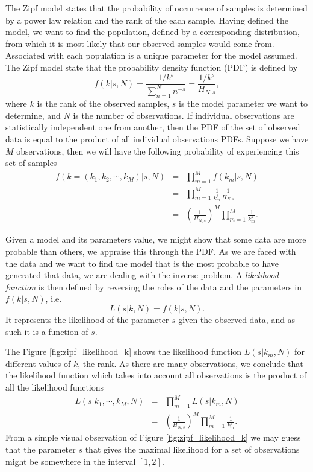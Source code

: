 The Zipf model states that the probability of occurrence of samples is determined by a power law relation
and the rank of the each sample. Having defined the model, we want to find the population, defined
by a corresponding distribution, from which it is most likely that our observed samples would come from.
Associated with each population is a unique parameter for the model assumed. The Zipf model state that the 
probability density function (PDF) is defined by
\begin{equation}
\label{eq:zipf_relation}
f(k | s, N) = \frac{1/k^s}{\sum_{n=1}^{N} n^{-s}} = \frac{1/k^s}{H_{N,s}} ,
\end{equation} 
where $k$ is the rank of the observed samples, $s$ is the model parameter we want to determine,
and $N$ is the number of observations.
If individual observations are statistically independent one from another, then the PDF
of the set of observed data is equal to the product of all individual observations PDFs.
Suppose we have $M$ observations, then we will have the following probability
of experiencing this set of samples
\begin{eqnarray}
f(k=(k_1, k_2, \cdots, k_M) | s, N) &=& \prod_{m=1}^{M} f(k_m | s, N) \nonumber \\
		&=& \prod_{m=1}^{M} \frac{1}{k_m^s} \frac{1}{H_{N,s}} \nonumber \\
		&=& \left( \frac{1}{H_{N,s}} \right)^M \prod_{m=1}^{M} \frac{1}{k_m^s} .
\end{eqnarray}

Given a model and its parameters value, we might show that some data are more probable than others,
we appraise this through the PDF. As we are faced with the data and we want to find the model
that is the most probable to have generated that data, we are dealing with the inverse problem.
A \textit{likelihood function} is then defined by reversing the roles of the data and the parameters
in $f(k | s, N)$, i.e.
\begin{equation}
L(s | k, N) = f(k | s, N) .
\end{equation}
It represents the likelihood of the parameter $s$ given the observed data, and as such it is a function of $s$.

The Figure \ref{fig:zipf_likelihood_k} shows the likelihood function $L(s|k_m,N)$ for different values of $k$, the rank.
As there are many observations, we conclude that the likelihood function which takes into account all
observations is the product of all the likelihood functions
\begin{eqnarray}
L(s|k_1,\cdots,k_M,N) &=& \prod_{m=1}^{M} L(s|k_m,N) \nonumber \\
          &=& \left( \frac{1}{H_{N,s}} \right)^M \prod_{m=1}^{M} \frac{1}{k_m^s} .
\end{eqnarray}
From a simple visual observation of Figure \ref{fig:zipf_likelihood_k} we may guess that the parameter $s$ that
gives the maximal likelihood for a set of observations might be somewhere in the interval $[1,2]$.

